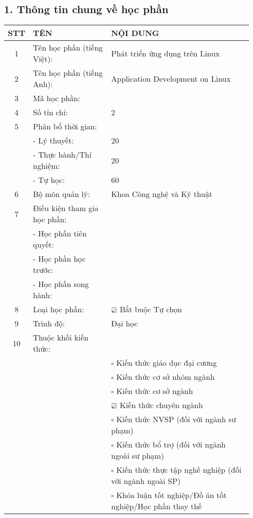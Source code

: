 \documentclass[a4paper,13pt]{article}
\newcommand{\checkedbox}{{\small$\ooalign{$\square$\cr\hfil{\scriptsize$\checkmark$}\hfil\cr}$}}
\newcommand{\uncheckedbox}{{\small$\square$}}
\begin{document}
\subsection*{1. Thông tin chung về học phần}
\begin{tabular}{|c|p{5cm}|p{9cm}|}
\hline
\textbf{STT} & \textbf{TÊN} & \textbf{NỘI DUNG} \\
\hline
1 & Tên học phần (tiếng Việt): & Phát triển ứng dụng trên Linux \\
\hline
2 & Tên học phần (tiếng Anh): & Application Development on Linux \\
\hline
3 & Mã học phần: & \\
\hline
4 & Số tín chỉ: & 2 \\
\hline
5 & Phân bổ thời gian: & \\
\hline
  & - Lý thuyết: & 20 \\
\hline
  & - Thực hành/Thí nghiệm: & 20 \\
\hline
  & - Tự học: & 60 \\
\hline
6 & Bộ môn quản lý: & Khoa Công nghệ và Kỹ thuật \\
\hline
7 & Điều kiện tham gia học phần: & \\
\hline
  & - Học phần tiên quyết: & \\
\hline
  & - Học phần học trước: & \\
\hline
  & - Học phần song hành: & \\
\hline
8 & Loại học phần: & \checkedbox{} Bắt buộc \quad \uncheckedbox{} Tự chọn \\
\hline
9 & Trình độ: & Đại học \\
\hline
10 & Thuộc khối kiến thức: & \\
\hline
\  & & \uncheckedbox{} Kiến thức giáo dục đại cương \\
\hline
\  & & \uncheckedbox{} Kiến thức cơ sở nhóm ngành \\
\hline
\  & & \uncheckedbox{} Kiến thức cơ sở ngành \\
\hline
\  & & \checkedbox{} Kiến thức chuyên ngành \\
\hline
\  & & \uncheckedbox{} Kiến thức NVSP (đối với ngành sư phạm) \\
\hline
\  & & \uncheckedbox{} Kiến thức bổ trợ (đối với ngành ngoài sư phạm) \\
\hline
\  & & \uncheckedbox{} Kiến thức thực tập nghề nghiệp (đối với ngành ngoài SP) \\
\hline
\  & & \uncheckedbox{} Khóa luận tốt nghiệp/Đồ án tốt nghiệp/Học phần thay thế \\
\hline
\end{tabular}
\end{document}
